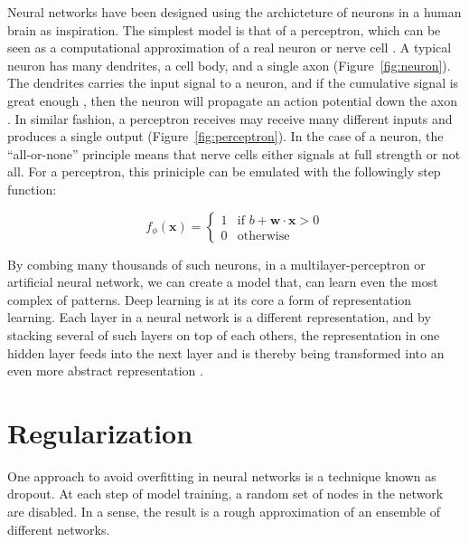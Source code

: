 Neural networks have been designed
using the archicteture of neurons in a human brain as inspiration.
The simplest model is that of a perceptron, 
which can be seen as a computational approximation
of a real neuron or nerve cell%
\autocite{charniakIntroduction2019}.
A typical neuron has many dendrites, a cell body, and a single axon 
(Figure~\ref{fig:neuron}).
The dendrites carries the input signal to a neuron,
and if the cumulative signal is great enough%
, 
then the neuron will propagate an action potential down the axon%
\autocite{seifterConcepts2005}.
In similar fashion, a perceptron receives may receive many different inputs
and produces a single output (Figure~\ref{fig:perceptron}).
In the case of a neuron, the \enquote{all-or-none} principle means
that nerve cells either signals at full strength or not all.
For a perceptron, this priniciple can be emulated
with the followingly step function:

\begin{equation}
    f_{\phi}(\mathbf{x})  = 
        \begin{cases}
            1 & \text{if } b + \mathbf{w} \cdot \mathbf{x} > 0\\
            0 & \text{otherwise}
        \end{cases}
\end{equation}

By combing many thousands of such neurons,
in a multilayer-perceptron or artificial neural network,
we can create a model that, 
can learn even the most complex of patterns.
Deep learning is at its core a form of representation learning.
Each layer in a neural network is a different representation,
and by stacking several of such layers on top of each others,
the representation in one hidden layer
feeds into the next layer and
is thereby being transformed into an even more abstract representation%
\autocite{estevaGuide2019}.



\section{Regularization}

One approach to avoid overfitting in neural networks
is a technique known as dropout.
At each step of model training,
a random set of nodes in the network are disabled.
In a sense, the result is a rough approximation of 
an ensemble of different networks.


